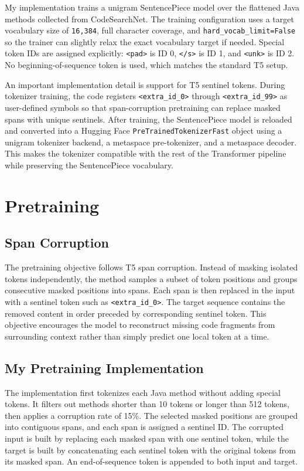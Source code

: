 \documentclass[11pt]{article}
\begin{document}
My implementation trains a unigram SentencePiece model over the flattened Java methods collected from CodeSearchNet. The training configuration uses a target vocabulary size of \texttt{16,384}, full character coverage, and \texttt{hard\_vocab\_limit=False} so the trainer can slightly relax the exact vocabulary target if needed. Special token IDs are assigned explicitly: \texttt{<pad>} is ID 0, \texttt{</s>} is ID 1, and \texttt{<unk>} is ID 2. No beginning-of-sequence token is used, which matches the standard T5 setup.

An important implementation detail is support for T5 sentinel tokens. During tokenizer training, the code registers \texttt{<extra\_id\_0>} through \texttt{<extra\_id\_99>} as user-defined symbols so that span-corruption pretraining can replace masked spans with unique sentinels. After training, the SentencePiece model is reloaded and converted into a Hugging Face \texttt{PreTrainedTokenizerFast} object using a unigram tokenizer backend, a metaspace pre-tokenizer, and a metaspace decoder. This makes the tokenizer compatible with the rest of the Transformer pipeline while preserving the SentencePiece vocabulary.

\section{Pretraining}
\subsection{Span Corruption}
The pretraining objective follows T5 span corruption. Instead of masking isolated tokens independently, the method samples a subset of token positions and groups consecutive masked positions into spans. Each span is then replaced in the input with a sentinel token such as \texttt{<extra\_id\_0>}. The target sequence contains the removed content in order preceded by corresponding sentinel token. This objective encourages the model to reconstruct missing code fragments from surrounding context rather than simply predict one local token at a time.

\subsection{My Pretraining Implementation}
The implementation first tokenizes each Java method without adding special tokens. It filters out methods shorter than 10 tokens or longer than 512 tokens, then applies a corruption rate of 15\%. The selected masked positions are grouped into contiguous spans, and each span is assigned a sentinel ID. The corrupted input is built by replacing each masked span with one sentinel token, while the target is built by concatenating each sentinel token with the original tokens from its masked span. An end-of-sequence token is appended to both input and target.
\end{document}
